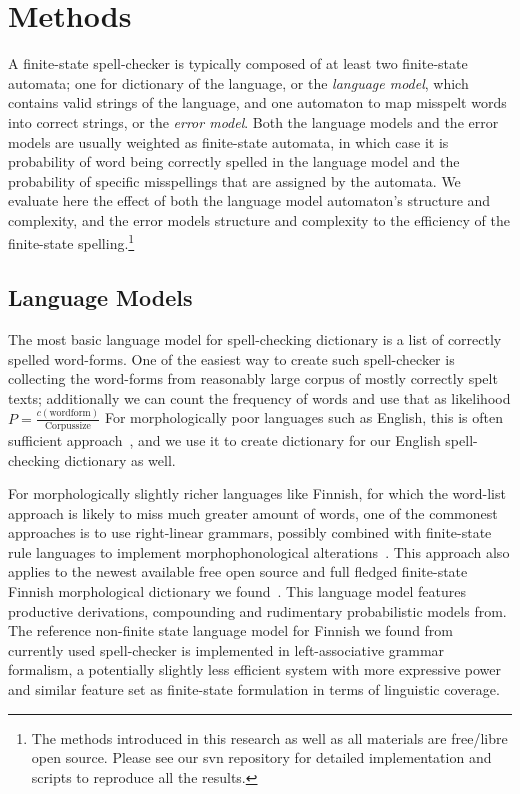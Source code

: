\documentclass[11pt]{article}
\begin{document}
\section{Methods}
\label{sec:methods}

A finite-state spell-checker is typically composed of at least two finite-state
automata; one for dictionary of the language, or the \emph{language model},
which contains valid strings of the language, and one automaton to map misspelt
words into correct strings, or the \emph{error model}. Both the language models
and the error models are usually weighted as finite-state automata, in which
case it is probability of word being correctly spelled in the language model
and the probability of specific misspellings that are assigned by the automata.
We evaluate here the effect of both the language model automaton's structure
and complexity, and the error models structure and complexity to the efficiency
of the finite-state spelling.\footnote{The methods introduced in this research
as well as all materials are free/libre open source. Please see our svn
repository for detailed implementation and scripts to reproduce all the
results.}

\subsection{Language Models}
\label{subsec:language-models}

The most basic language model for spell-checking dictionary is a list of
correctly spelled word-forms. One of the easiest way to create such 
spell-checker is collecting the word-forms from reasonably large corpus of
mostly correctly spelt texts; additionally we can count the frequency of words
and use that as likelihood $P=\frac{c(\mathrm{wordform})}{\mathrm{Corpus size}}$
For morphologically poor languages such as English, this is often sufficient
approach~\cite{norvig/2010}, and we use it to create dictionary for our English
spell-checking dictionary as well.

For morphologically slightly richer languages like Finnish, for which the
word-list approach is likely to miss much greater amount of words, one of the
commonest approaches is to use right-linear grammars, possibly combined with
finite-state rule languages to implement morphophonological
alterations~\cite{koskenniemi/1983}. This approach also applies to the newest
available free open source and full fledged finite-state Finnish morphological
dictionary we found~\cite{pirinen/2011/nodalida}. This language model features
productive derivations, compounding and rudimentary probabilistic models from.
The reference non-finite state language model for Finnish we found from
currently used spell-checker is implemented in left-associative grammar
formalism, a potentially slightly less efficient system with more expressive
power and similar feature set as finite-state formulation in terms of
linguistic coverage.
\end{document}
